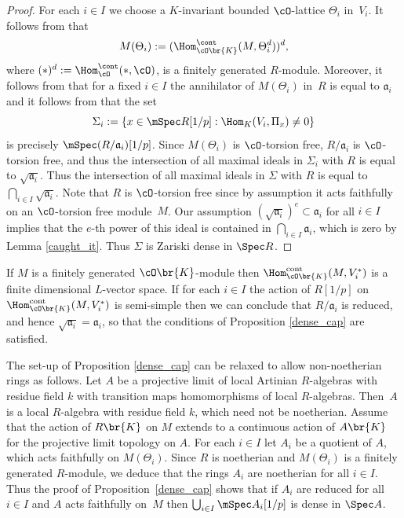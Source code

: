 \begin{proof} For each $i\in I$ we choose a $K$-invariant bounded $\cO$-lattice $\Theta_i$ in~$V_i$.
It follows from
\cite[Prop.\,2.15]{duke} that
\[
M(\Theta_i):=(\Hom_{\cO\br{K}}^{\cont}(M, \Theta_i^d))^d,
\]
where
$(\ast)^d:=\Hom_{\cO}^{\cont}(\ast, \cO)$, is a finitely generated $R$-module. Moreover, it follows from
\cite[Eqn.\,(11) and Rem.\,2.18]{duke} that for a fixed $i\in I$ the annihilator of $M(\Theta_i)$ in~$R$ is equal to $\mathfrak a_i$ and it follows from \cite[Prop.\,2.22]{duke} that the set
\[
\Sigma_i:=\{ x\in \mSpec R[1/p]: \Hom_K(V_i, \Pi_x)\neq 0\}
\]
is precisely $\mSpec (R/\mathfrak a_i)[1/p]$. Since $M(\Theta_i)$ is $\cO$-torsion free, $R/\mathfrak a_i$ is $\cO$-torsion free, and thus the intersection of all maximal ideals in $\Sigma_i$ with $R$ is equal to $\sqrt{\mathfrak a_i}$. Thus the intersection of all maximal ideals in $\Sigma$ with $R$ is equal to $\bigcap_{i\in I} \sqrt{\mathfrak a_i}$.
Note that $R$ is $\cO$-torsion free since by assumption it acts faithfully on an $\cO$-torsion free module~$M$.
Our assumption $(\sqrt{\mathfrak a_i})^e \subset \mathfrak a_i$ for all $i\in I$
implies that the $e$-th power of this ideal is contained in $\bigcap_{i\in I} \mathfrak a_i$, which is zero by Lemma \ref{caught_it}. Thus $\Sigma$ is Zariski dense in $\Spec R$.
\end{proof}

\begin{remark}\label{rem:semi-simple}
If $M$ is a finitely generated $\cO\br{K}$-module then $\Hom_{\cO\br{K}}^{\rm cont}(M, V_i^*)$ is a finite dimensional $L$-vector space.
If for each $i\in I$ the action of $R[1/p]$ on $\Hom_{\cO\br{K}}^{\rm cont}(M, V_i^*)$ is semi-simple then we can conclude that $R/\mathfrak a_i$ is reduced, and
hence $\sqrt{\mathfrak a_i}=\mathfrak a_i$, so that the conditions of Proposition \ref{dense_cap} are satisfied.
\end{remark}

\begin{remark}\label{nonnoetherian} The set-up of Proposition \ref{dense_cap} can be relaxed to allow non-noetherian rings as follows.
Let $A$ be a projective limit of local Artinian $R$-algebras with residue field $k$ with transition maps homomorphisms of local $R$-algebras. Then~$A$ is a local
$R$-algebra with residue field $k$, which need not be noetherian. Assume that the action of $R\br{K}$ on
$M$ extends to a continuous action of $A\br{K}$ for the projective limit topology on $A$. For each $i\in I$ let $A_i$ be a quotient of $A$, which acts faithfully on $M(\Theta_i)$.
Since $R$ is noetherian and $M(\Theta_i)$ is a finitely generated $R$-module, we deduce that the rings $A_i$ are noetherian for all $i\in I$.
Thus the proof of \hbox{Proposition}~\ref{dense_cap} shows that if $A_i$ are reduced for all $i\in I$ and $A$ acts faithfully on~$M$ then $\bigcup_{i\in I} \mSpec A_i [1/p]$
is dense in $\Spec A$.
\end{remark}

